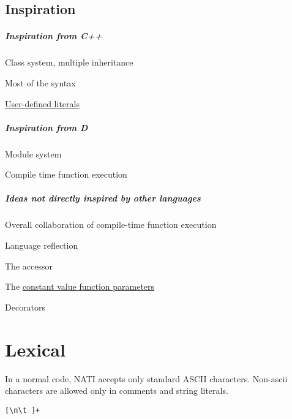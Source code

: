 \section{Inspiration}
\paragraph{Inspiration from C++}
\begin{compactitem}
	\item Class system, multiple inheritance
	\item Most of the syntax
	\item \hyperref[userDefinedLiterals]{User-defined literals}
\end{compactitem}

\paragraph{Inspiration from D}
\begin{compactitem}
	\item Module system
	\item Compile time function execution
\end{compactitem}

\paragraph{Ideas not directly inspired by other languages}
\begin{compactitem}
	\item Overall collaboration of compile-time function execution
	\item Language reflection
	\item The \hyperref[colonAccessor]{\kwd{:}} accessor
	\item The \hyperref[constantValueParameter]{constant value function parameters}	
	\item Decorators
\end{compactitem}

\chapter{Lexical}
In a normal code, NATI accepts only standard ASCII characters. Non-ascii characters are allowed only in comments and string literals.

\begin{grammar}
	 \verb|[\n\t ]+|
\end{grammar}

